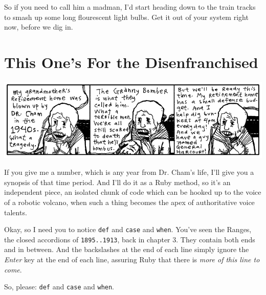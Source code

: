 \documentclass[10pt,twoside]{report}
\begin{document}
So if you need to call him a madman, I'd start heading down to the
train tracks to smash up some long flourescent light bulbs.  Get it
out of your system right now, before we dig in.


\section{This One's For the Disenfranchised}


	\includegraphics[width=1.0\textwidth]{cache/33.png}

If you give me a number, which is any year from Dr. Cham's life, I'll
give you a synopsis of that time period.  And I'll do it as a Ruby
method, so it's an independent piece, an isolated chunk of code which
can be hooked up to the voice of a robotic volcano, when such a thing
becomes the apex of authoritative voice talents.

Okay, so I need you to notice \lstinline[breaklines=true]|def| and
\lstinline[breaklines=true]|case| and
\lstinline[breaklines=true]|when|.  You've seen the Ranges, the closed
accordions of \lstinline[breaklines=true]|1895..1913|, back in chapter
3.  They contain both ends and in between.  And the backslashes at the
end of each line simply ignore the {\em Enter} key at the end of each
line, assuring Ruby that there is {\em more of this line to come}.

So, please: \lstinline[breaklines=true]|def| and
\lstinline[breaklines=true]|case| and
\lstinline[breaklines=true]|when|.
\end{document}
